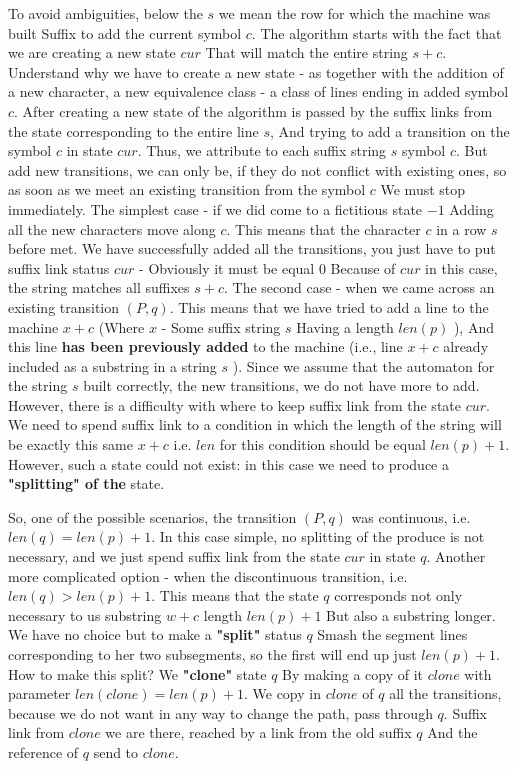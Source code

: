 To avoid ambiguities, below the $s$ we mean the row for which the machine was built Suffix to add the current symbol $c$.
The algorithm starts with the fact that we are creating a new state $cur$ That will match the entire string $s + c$. Understand why we have to create a new state - as together with the addition of a new character, a new equivalence class - a class of lines ending in added symbol $c$.
After creating a new state of the algorithm is passed by the suffix links from the state corresponding to the entire line $s$, And trying to add a transition on the symbol $c$ in state $cur$. Thus, we attribute to each suffix string $s$ symbol $c$. But add new transitions, we can only be, if they do not conflict with existing ones, so as soon as we meet an existing transition from the symbol $c$ We must stop immediately.
The simplest case - if we did come to a fictitious state $-1$ Adding all the new characters move along $c$. This means that the character $c$ in a row $s$ before met. We have successfully added all the transitions, you just have to put suffix link status $cur$ - Obviously it must be equal $0$ Because of $cur$ in this case, the string matches all suffixes $s + c$.
The second case - when we came across an existing transition $(P, q)$. This means that we have tried to add a line to the machine $x + c$ (Where $x$ - Some suffix string $s$ Having a length $len (p)$ ), And this line \textbf{has been previously added} to the machine (i.e., line $x + c$ already included as a substring in a string $s$ ). Since we assume that the automaton for the string $s$ built correctly, the new transitions, we do not have more to add.
However, there is a difficulty with where to keep suffix link from the state $cur$. We need to spend suffix link to a condition in which the length of the string will be exactly this same $x + c$ i.e. $len$ for this condition should be equal $len (p) + 1$. However, such a state could not exist: in this case we need to produce a \textbf{"splitting" of the} state.

So, one of the possible scenarios, the transition $(P, q)$ was continuous, i.e. $len (q) = len (p) + 1$. In this case simple, no splitting of the produce is not necessary, and we just spend suffix link from the state $cur$ in state $q$.
Another more complicated option - when the discontinuous transition, i.e. $len (q)> len (p) + 1$. This means that the state $q$ corresponds not only necessary to us substring $w + c$ length $len (p) + 1$ But also a substring longer. We have no choice but to make a \textbf{"split"} status $q$ Smash the segment lines corresponding to her two subsegments, so the first will end up just $len (p) + 1$.
How to make this split? We \textbf{"clone"} state $q$ By making a copy of it $clone$ with parameter $len (clone) = len (p) + 1$. We copy in $clone$ of $q$ all the transitions, because we do not want in any way to change the path, pass through $q$. Suffix link from $clone$ we are there, reached by a link from the old suffix $q$ And the reference of $q$ send to $clone$.

